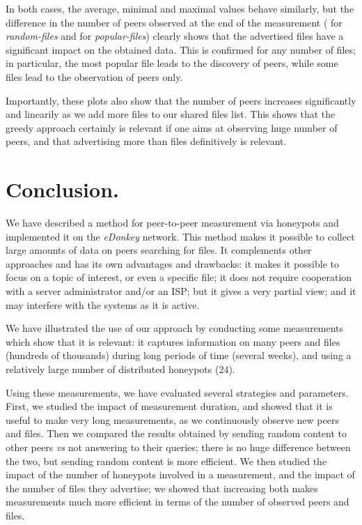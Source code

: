 \documentclass[final,
notitlepage,
narroweqnarray,
	inline,
	twoside,
]{ieee}
\begin{document}
In both cases, the average, minimal and maximal values behave
similarly, but the difference in the number of peers observed at the
end of the measurement ( for {\em random-files} and  for
{\em popular-files}) clearly shows that the advertised files have a
significant impact on the obtained data. This is confirmed for any
number of files; in particular, the most popular file leads to the
discovery of  peers, while some files lead to the observation
of  peers only.

Importantly, these plots also show that the number of peers increases significantly and linearily as we add more files to our shared files list. This shows that the greedy approach certainly is relevant if one aims at observing huge number of peers, and that advertising more than  files definitively is relevant.

\section{Conclusion.}
\label{sec-conclu}

We have described a method for peer-to-peer measurement via honeypots and implemented it on the {\em eDonkey} network. This method makes it possible to collect large amounts of data on peers searching for files. It complements other approaches and has its own advantages and drawbacks: it makes it possible to focus on a topic of interest, or even a specific file; it does not require cooperation with a server administrator and/or an ISP; but it gives a very partial view; and it may interfere with the systems as it is active.

We have illustrated the use of our approach by conducting some measurements which show that it is relevant: it captures information on many peers and files (hundreds of thousands) during long periods of time (several weeks), and using a relatively large number of distributed honeypots (24).

Using these measurements, we have evaluated several strategies and parameters. First, we studied the impact of measurement duration, and showed that it is useful to make very long measurements, as we continuously observe new peers and files. Then we compared the results obtained by sending random content to other peers {\em vs} not answering to their queries; there is no huge difference between the two, but sending random content is more efficient. We then studied the impact of the number of honeypots involved in a measurement, and the impact of the number of files they advertise; we showed that increasing both makes measurements much more efficient in terms of the number of observed peers and files.
\end{document}
